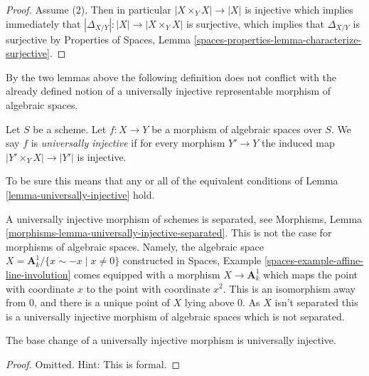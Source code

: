 \begin{proof}
\medskip\noindent
Assume (2). Then in particular $|X \times_Y X| \to |X|$ is injective
which implies immediately that
$|\Delta_{X/Y}| : |X| \to |X \times_Y X|$ is surjective, which
implies that $\Delta_{X/Y}$ is surjective by
Properties of Spaces,
Lemma \ref{spaces-properties-lemma-characterize-surjective}.
\end{proof}

\noindent
By the two lemmas above the following definition does not conflict with
the already defined notion of a universally injective representable morphism
of algebraic spaces.

\begin{definition}
\label{definition-universally-injective}
Let $S$ be a scheme. Let $f : X \to Y$ be a morphism of algebraic
spaces over $S$. We say $f$ is {\it universally injective} if
for every morphism $Y' \to Y$ the induced map
$|Y' \times_Y X| \to |Y'|$ is injective.
\end{definition}

\noindent
To be sure this means that any or all of the equivalent conditions of
Lemma \ref{lemma-universally-injective}
hold.

\begin{remark}
\label{remark-universally-injective-not-separated}
A universally injective morphism of schemes is separated, see
Morphisms, Lemma
\ref{morphisms-lemma-universally-injective-separated}.
This is not the case for morphisms of algebraic spaces.
Namely, the algebraic space
$X = \mathbf{A}^1_k/\{x \sim -x \mid x \not = 0\}$
constructed in
Spaces, Example \ref{spaces-example-affine-line-involution}
comes equipped with a morphism $X \to \mathbf{A}^1_k$ which maps
the point with coordinate $x$ to the point with coordinate $x^2$.
This is an isomorphism away from $0$, and there is a unique point
of $X$ lying above $0$. As $X$ isn't separated this is a universally
injective morphism of algebraic spaces which is not separated.
\end{remark}

\begin{lemma}
\label{lemma-base-change-universally-injective}
The base change of a universally injective morphism is universally injective.
\end{lemma}

\begin{proof}
Omitted. Hint: This is formal.
\end{proof}

